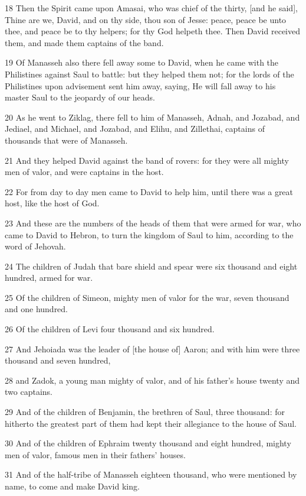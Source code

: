 \par 18 Then the Spirit came upon Amasai, who was chief of the thirty, [and he said], Thine are we, David, and on thy side, thou son of Jesse: peace, peace be unto thee, and peace be to thy helpers; for thy God helpeth thee. Then David received them, and made them captains of the band.
\par 19 Of Manasseh also there fell away some to David, when he came with the Philistines against Saul to battle: but they helped them not; for the lords of the Philistines upon advisement sent him away, saying, He will fall away to his master Saul to the jeopardy of our heads.
\par 20 As he went to Ziklag, there fell to him of Manasseh, Adnah, and Jozabad, and Jediael, and Michael, and Jozabad, and Elihu, and Zillethai, captains of thousands that were of Manasseh.
\par 21 And they helped David against the band of rovers: for they were all mighty men of valor, and were captains in the host.
\par 22 For from day to day men came to David to help him, until there was a great host, like the host of God.
\par 23 And these are the numbers of the heads of them that were armed for war, who came to David to Hebron, to turn the kingdom of Saul to him, according to the word of Jehovah.
\par 24 The children of Judah that bare shield and spear were six thousand and eight hundred, armed for war.
\par 25 Of the children of Simeon, mighty men of valor for the war, seven thousand and one hundred.
\par 26 Of the children of Levi four thousand and six hundred.
\par 27 And Jehoiada was the leader of [the house of] Aaron; and with him were three thousand and seven hundred,
\par 28 and Zadok, a young man mighty of valor, and of his father's house twenty and two captains.
\par 29 And of the children of Benjamin, the brethren of Saul, three thousand: for hitherto the greatest part of them had kept their allegiance to the house of Saul.
\par 30 And of the children of Ephraim twenty thousand and eight hundred, mighty men of valor, famous men in their fathers' houses.
\par 31 And of the half-tribe of Manasseh eighteen thousand, who were mentioned by name, to come and make David king.
